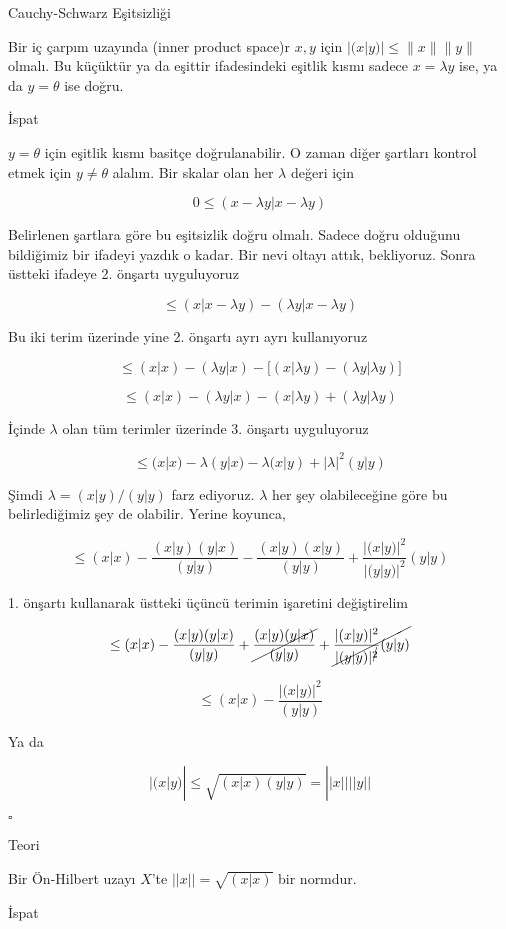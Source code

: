 \documentclass[12pt,fleqn]{article}\usepackage{../../common}
\begin{document}
Cauchy-Schwarz Eşitsizliği

Bir iç çarpım uzayında (inner product space)r $x,y$ için $|(x|y)| \le
\|x\|\|y\|$ olmalı. Bu küçüktür ya da eşittir ifadesindeki eşitlik kısmı sadece $x = \lambda y$
ise, ya da $y = \theta$ ise doğru. 

İspat

$y = \theta$ için eşitlik kısmı basitçe doğrulanabilir. O zaman diğer
şartları kontrol etmek için $y \ne \theta$ alalım. Bir skalar olan her
$\lambda$ değeri için 

$$ 
0 \le (x-\lambda y | x-\lambda y) 
 $$

Belirlenen şartlara göre bu eşitsizlik doğru olmalı. Sadece doğru olduğunu
bildiğimiz bir ifadeyi yazdık o kadar. Bir nevi oltayı attık, bekliyoruz. 
Sonra üstteki ifadeye 2. önşartı uyguluyoruz

$$ \le (x|x-\lambda y) - (\lambda y| x - \lambda y)$$

Bu iki terim üzerinde yine 2. önşartı ayrı ayrı kullanıyoruz

$$ 
\le (x|x) - (\lambda y|x) - 
\bigg[ (x|\lambda y) - (\lambda y|\lambda y) \bigg] 
$$

$$ 
\le (x|x) - (\lambda y|x) -  (x|\lambda y) + (\lambda y|\lambda y) 
$$

İçinde $\lambda$ olan tüm terimler üzerinde 3. önşartı uyguluyoruz

$$ 
\le
(x|x) - \lambda(y|x) -
\lambda(x|y) + |\lambda|^2 (y|y)
 $$

Şimdi $\lambda  = (x|y)/(y|y)$ farz ediyoruz. $\lambda$ her şey olabileceğine göre bu 
belirlediğimiz şey de olabilir. Yerine koyunca, 

$$ \le (x|x) - 
\frac{ (x|y)(y|x)}{(y|y)} - 
\frac{ (x|y)(x|y)}{(y|y)} + 
\frac{ |(x|y)|^2}{|(y|y)|^2}(y|y)
 $$

1. önşartı kullanarak üstteki üçüncü terimin işaretini değiştirelim

$$ \le (x|x) - 
\frac{ (x|y)(y|x)}{(y|y)} +
\cancel{\frac{ (x|y)(y|x)}{(y|y)}} + 
\cancel{\frac{ |(x|y)|^2}{|(y|y)|^{\cancel{2}}}(y|y)}
 $$

$$ \le (x|x) - 
\frac{ |(x|y)|^2}{(y|y)}
 $$

Ya da 

$$ |(x|y)|  \le \sqrt{ (x|x)(y|y)} = ||x||||y||$$

$ \square $

Teori 

Bir Ön-Hilbert uzayı $X$'te $||x|| = \sqrt{ (x|x)}$ bir normdur. 

İspat
\end{document}
